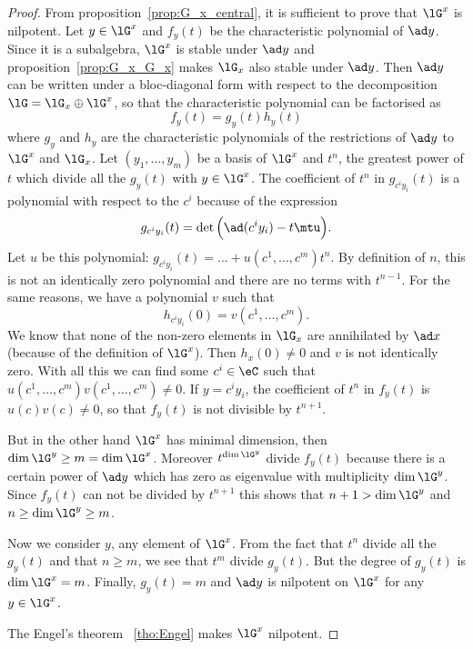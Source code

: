 \begin{proof}
From proposition~\ref{prop:G_x_central}, it is sufficient to prove that $\lG^x$ is nilpotent. Let $y\in\lG^x$ and $f_y(t)$ be the characteristic polynomial of $\ad y$. Since it is a subalgebra, $\lG^x$ is stable under $\ad y$ and proposition~\ref{prop:G_x_G_x} makes $\lG_x$ also stable under $\ad y$. Then $\ad y$ can be written under a bloc-diagonal form with respect to the decomposition $\lG=\lG_x\oplus\lG^x$, so that the characteristic polynomial can be factorised as
\begin{equation}
f_y(t)=g_y(t)h_y(t)
\end{equation}
where $g_y$ and $h_y$ are the characteristic polynomials of the restrictions of $\ad y$ to $\lG^x$ and $\lG_x$. Let $(y_1,\ldots,y_m)$ be a basis of $\lG^x$ and $t^n$, the greatest power of $t$ which divide all the $g_y(t)$ with $y\in\lG^x$. The coefficient of $t^n$ in $g_{c^iy_i}(t)$ is a polynomial with respect to the $c^i$ because of the expression
\[
g_{c^iy_i}(t)=\det\Big( \ad(c^iy_i)-t\mtu \Big).
\]
Let $u$ be this polynomial: $g_{c^iy_i}(t)=\ldots+u(c^1,\ldots,c^m)t^n$. By definition of $n$, this is not an identically zero polynomial and there are no terms with $t^{n-1}$. For the same reasons, we have a polynomial $v$ such that
\begin{equation}
h_{c^iy_i}(0)=v(c^1,\ldots,c^m).
\end{equation}
We know that none of the non-zero elements in $\lG_x$ are annihilated by $\ad x$ (because of the definition of $\lG^x$). Then $h_x(0)\neq 0$ and $v$ is not identically zero. With all this we can find some $c^i\in\eC$ such that $u(c^1,\ldots,c^m)v(c^1,\ldots,c^m)\neq 0$. If $y=c^iy_i$, the coefficient of $t^n$ in $f_y(t)$ is $u(c)v(c)\neq 0$, so that $f_y(t)$ is not divisible by $t^{n+1}$.

But in the other hand $\lG^x$ has minimal dimension, then $\dim\lG^y\geq m=\dim\lG^x$. Moreover $t^{\dim\lG^y}$ divide $f_y(t)$ because there is a certain power of $\ad y$ which has zero as eigenvalue with multiplicity $\dim\lG^y$. Since $f_y(t)$ can not be divided by $t^{n+1}$ this shows that $n+1>\dim\lG^y$ and $n\geq\dim\lG^y\geq m$.

Now we consider $y$, any element of $\lG^x$. From the fact that $t^n$ divide all the $g_y(t)$ and that $n\geq m$, we see that $t^m$ divide $g_y(t)$. But the degree of $g_y(t)$ is $\dim\lG^x=m$. Finally, $g_y(t)=m$ and $\ad y$ is nilpotent on $\lG^x$ for any $y\in\lG^x$.

The Engel's theorem ~\ref{tho:Engel} makes $\lG^x$ nilpotent.
\end{proof}



